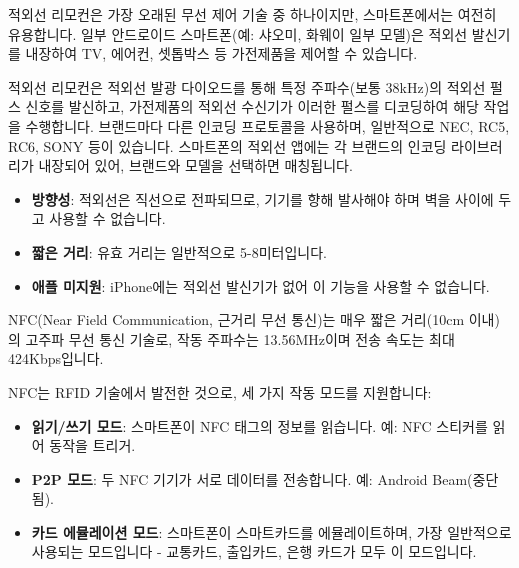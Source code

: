 적외선 리모컨은 가장 오래된 무선 제어 기술 중 하나이지만, 스마트폰에서는 여전히 유용합니다. 일부 안드로이드 스마트폰(예: 샤오미, 화웨이 일부 모델)은 적외선 발신기를 내장하여 TV, 에어컨, 셋톱박스 등 가전제품을 제어할 수 있습니다.


적외선 리모컨은 적외선 발광 다이오드를 통해 특정 주파수(보통 38kHz)의 적외선 펄스 신호를 발신하고, 가전제품의 적외선 수신기가 이러한 펄스를 디코딩하여 해당 작업을 수행합니다. 브랜드마다 다른 인코딩 프로토콜을 사용하며, 일반적으로 NEC, RC5, RC6, SONY 등이 있습니다. 스마트폰의 적외선 앱에는 각 브랜드의 인코딩 라이브러리가 내장되어 있어, 브랜드와 모델을 선택하면 매칭됩니다.


\begin{itemize}
  \item \textbf{방향성}: 적외선은 직선으로 전파되므로, 기기를 향해 발사해야 하며 벽을 사이에 두고 사용할 수 없습니다.
  \item \textbf{짧은 거리}: 유효 거리는 일반적으로 5-8미터입니다.
  \item \textbf{애플 미지원}: iPhone에는 적외선 발신기가 없어 이 기능을 사용할 수 없습니다.
\end{itemize}


NFC(Near Field Communication, 근거리 무선 통신)는 매우 짧은 거리(10cm 이내)의 고주파 무선 통신 기술로, 작동 주파수는 13.56MHz이며 전송 속도는 최대 424Kbps입니다.


NFC는 RFID 기술에서 발전한 것으로, 세 가지 작동 모드를 지원합니다:

\begin{itemize}
  \item \textbf{읽기/쓰기 모드}: 스마트폰이 NFC 태그의 정보를 읽습니다. 예: NFC 스티커를 읽어 동작을 트리거.
  \item \textbf{P2P 모드}: 두 NFC 기기가 서로 데이터를 전송합니다. 예: Android Beam(중단됨).
  \item \textbf{카드 에뮬레이션 모드}: 스마트폰이 스마트카드를 에뮬레이트하며, 가장 일반적으로 사용되는 모드입니다 - 교통카드, 출입카드, 은행 카드가 모두 이 모드입니다.
\end{itemize}



